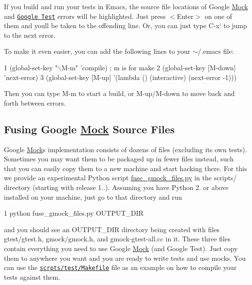 If you build and run your tests in Emacs, the source file locations of Google \hyperlink{class_mock}{Mock} and \href{http://code.google.com/p/googletest/}{\tt Google Test} errors will be highlighted. Just press {\ttfamily $<$Enter$>$} on one of them and you\textquotesingle{}ll be taken to the offending line. Or, you can just type {\ttfamily C-\/x}` to jump to the next error.

To make it even easier, you can add the following lines to your {\ttfamily $\sim$/.emacs} file\+:


\begin{DoxyCode}
1 (global-set-key "\(\backslash\)M-m"   'compile)  ; m is for make
2 (global-set-key [M-down] 'next-error)
3 (global-set-key [M-up]   '(lambda () (interactive) (next-error -1)))
\end{DoxyCode}


Then you can type {\ttfamily M-\/m} to start a build, or {\ttfamily M-\/up}/{\ttfamily M-\/down} to move back and forth between errors.

\subsection*{Fusing Google \hyperlink{class_mock}{Mock} Source Files}

Google \hyperlink{class_mock}{Mock}\textquotesingle{}s implementation consists of dozens of files (excluding its own tests). Sometimes you may want them to be packaged up in fewer files instead, such that you can easily copy them to a new machine and start hacking there. For this we provide an experimental Python script {\ttfamily \hyperlink{fuse__gmock__files_8py}{fuse\+\_\+gmock\+\_\+files.\+py}} in the {\ttfamily scripts/} directory (starting with release 1..). Assuming you have Python 2. or above installed on your machine, just go to that directory and run 
\begin{DoxyCode}
1 python fuse\_gmock\_files.py OUTPUT\_DIR
\end{DoxyCode}


and you should see an {\ttfamily O\+U\+T\+P\+U\+T\+\_\+\+D\+IR} directory being created with files {\ttfamily gtest/gtest.\+h}, {\ttfamily gmock/gmock.\+h}, and {\ttfamily gmock-\/gtest-\/all.\+cc} in it. These three files contain everything you need to use Google \hyperlink{class_mock}{Mock} (and Google Test). Just copy them to anywhere you want and you are ready to write tests and use mocks. You can use the \href{http://code.google.com/p/googlemock/source/browse/trunk/scripts/test/Makefile}{\tt scrpts/test/\+Makefile} file as an example on how to compile your tests against them.

